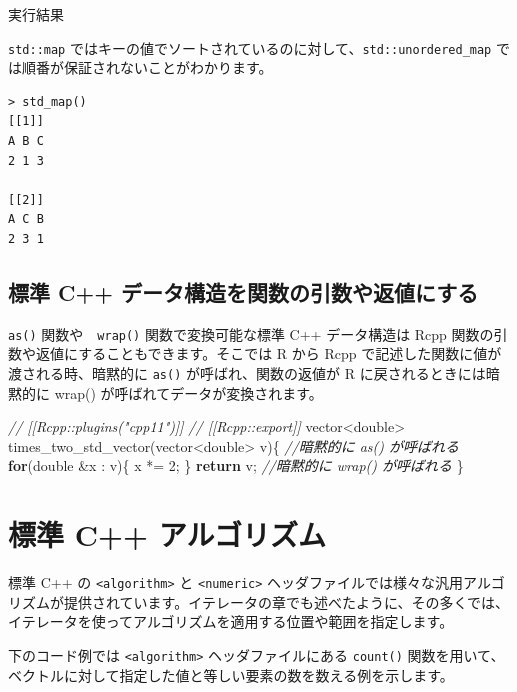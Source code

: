 \documentclass[]{book}
\newenvironment{Shaded}{\begin{snugshade}}{\end{snugshade}}
\newcommand{\CommentTok}[1]{\textcolor[rgb]{0.56,0.35,0.01}{\textit{#1}}}
\newcommand{\ControlFlowTok}[1]{\textcolor[rgb]{0.13,0.29,0.53}{\textbf{#1}}}
\newcommand{\DataTypeTok}[1]{\textcolor[rgb]{0.13,0.29,0.53}{#1}}
\newcommand{\DecValTok}[1]{\textcolor[rgb]{0.00,0.00,0.81}{#1}}
\newcommand{\NormalTok}[1]{#1}
\begin{document}
実行結果

\texttt{std::map} ではキーの値でソートされているのに対して、\texttt{std::unordered\_map} では順番が保証されないことがわかります。

\begin{verbatim}
> std_map()
[[1]]
A B C
2 1 3

[[2]]
A C B
2 3 1
\end{verbatim}

\hypertarget{-c-}{%
\section{標準 C++ データ構造を関数の引数や返値にする}\label{-c-}}

\texttt{as()} 関数や　\texttt{wrap()} 関数で変換可能な標準 C++ データ構造は Rcpp 関数の引数や返値にすることもできます。そこでは R から Rcpp で記述した関数に値が渡される時、暗黙的に \texttt{as()} が呼ばれ、関数の返値が R に戻されるときには暗黙的に wrap() が呼ばれてデータが変換されます。

\begin{Shaded}
\begin{Highlighting}[]
\CommentTok{// [[Rcpp::plugins("cpp11")]]}
\CommentTok{// [[Rcpp::export]]}
\NormalTok{vector<}\DataTypeTok{double}\NormalTok{> times_two_std_vector(vector<}\DataTypeTok{double}\NormalTok{> v)\{ }\CommentTok{//暗黙的に as() が呼ばれる}
    \ControlFlowTok{for}\NormalTok{(}\DataTypeTok{double}\NormalTok{ &x : v)\{}
\NormalTok{        x *= }\DecValTok{2}\NormalTok{;}
\NormalTok{    \}}
    \ControlFlowTok{return}\NormalTok{ v; }\CommentTok{//暗黙的に wrap() が呼ばれる}
\NormalTok{\}}
\end{Highlighting}
\end{Shaded}

\hypertarget{-c-}{%
\chapter{標準 C++ アルゴリズム}\label{-c-}}

標準 C++ の \texttt{\textless{}algorithm\textgreater{}} と \texttt{\textless{}numeric\textgreater{}} ヘッダファイルでは様々な汎用アルゴリズムが提供されています。イテレータの章でも述べたように、その多くでは、イテレータを使ってアルゴリズムを適用する位置や範囲を指定します。

下のコード例では \texttt{\textless{}algorithm\textgreater{}} ヘッダファイルにある \texttt{count()} 関数を用いて、ベクトルに対して指定した値と等しい要素の数を数える例を示します。
\end{document}

